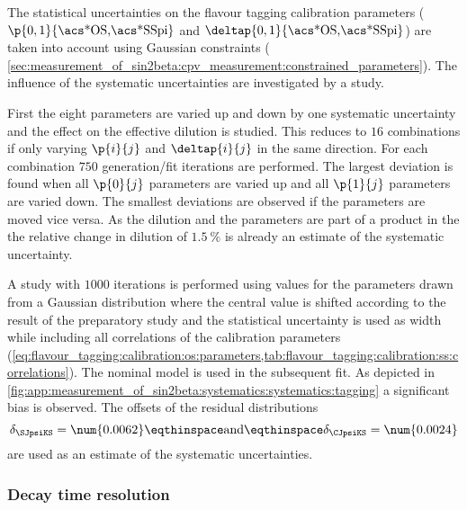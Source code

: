 The statistical uncertainties on the flavour tagging calibration parameters
($\p{0,1}{\text{\acs*{OS},\acs*{SSpi}}}$ and
$\deltap{0,1}{\text{\acs*{OS},\acs*{SSpi}}}$) are taken into account using
Gaussian constraints (\cf
\cref{sec:measurement_of_sin2beta:cpv_measurement:constrained_parameters}). The
influence of the systematic uncertainties are investigated by a \ToyMC study.

First the eight parameters are varied up and down by one systematic uncertainty
and the effect on the effective dilution is studied. This reduces to $16$
combinations if only varying $\p{i}{j}$ and $\deltap{i}{j}$ in the same direction.
For each combination $\num{750}$ generation/fit iterations are performed. The
largest deviation is found when all $\p{0}{j}$ parameters are varied up and all
$\p{1}{j}$ parameters are varied down. The smallest deviations are observed if
the parameters are moved vice versa. As the dilution and the \CP parameters are
part of a product in the \PDF the relative change in dilution of
$\SI{1.5}{\percent}$ is already an estimate of the systematic uncertainty.

A \ToyMC study with $\num{1000}$ iterations is performed using values for the
\CP parameters drawn from a Gaussian distribution where the central value is
shifted according to the result of the preparatory study and the statistical
uncertainty is used as width while including all correlations of the calibration
parameters 
(\cf \cref{eq:flavour_tagging:calibration:os:parameters,tab:flavour_tagging:calibration:ss:correlations}).
The nominal model is used in the subsequent fit. As depicted in 
\cref{fig:app:measurement_of_sin2beta:systematics:systematics:tagging} a
significant bias is observed. The offsets of the residual distributions
%
\begin{equation}
  \delta_{\SJpsiKS} = \num{0.0062}\eqthinspace\text{and}\eqthinspace\delta_{\CJpsiKS} = \num{0.0024}
\end{equation}
%
are used as an estimate of the systematic uncertainties.

\subsubsection{Decay time resolution}
\label{sec:measurement_of_sin2beta:systematics:systematics:resolution}

